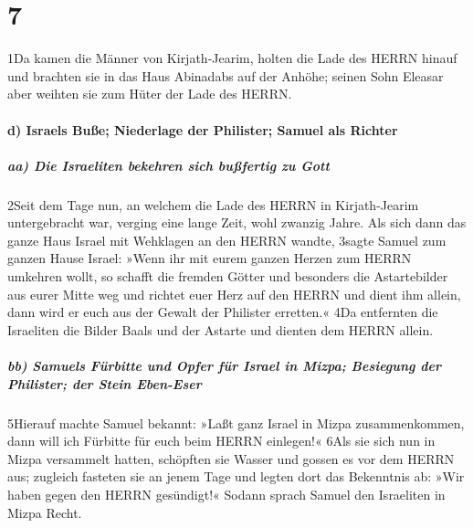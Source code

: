 \hypertarget{section-6}{%
\section{7}\label{section-6}}

1Da kamen die Männer von Kirjath-Jearim, holten die Lade des HERRN
hinauf und brachten sie in das Haus Abinadabs auf der Anhöhe; seinen
Sohn Eleasar aber weihten sie zum Hüter der Lade des HERRN.

\hypertarget{d-israels-buuxdfe-niederlage-der-philister-samuel-als-richter}{%
\paragraph{d) Israels Buße; Niederlage der Philister; Samuel als
Richter}\label{d-israels-buuxdfe-niederlage-der-philister-samuel-als-richter}}

\hypertarget{aa-die-israeliten-bekehren-sich-buuxdffertig-zu-gott}{%
\subparagraph{aa) Die Israeliten bekehren sich bußfertig zu
Gott}\label{aa-die-israeliten-bekehren-sich-buuxdffertig-zu-gott}}

2Seit dem Tage nun, an welchem die Lade des HERRN in Kirjath-Jearim
untergebracht war, verging eine lange Zeit, wohl zwanzig Jahre. Als sich
dann das ganze Haus Israel mit Wehklagen an den HERRN wandte, 3sagte
Samuel zum ganzen Hause Israel: »Wenn ihr mit eurem ganzen Herzen zum
HERRN umkehren wollt, so schafft die fremden Götter und besonders die
Astartebilder aus eurer Mitte weg und richtet euer Herz auf den HERRN
und dient ihm allein, dann wird er euch aus der Gewalt der Philister
erretten.« 4Da entfernten die Israeliten die Bilder Baals und der
Astarte und dienten dem HERRN allein.

\hypertarget{bb-samuels-fuxfcrbitte-und-opfer-fuxfcr-israel-in-mizpa-besiegung-der-philister-der-stein-eben-eser}{%
\subparagraph{bb) Samuels Fürbitte und Opfer für Israel in Mizpa;
Besiegung der Philister; der Stein
Eben-Eser}\label{bb-samuels-fuxfcrbitte-und-opfer-fuxfcr-israel-in-mizpa-besiegung-der-philister-der-stein-eben-eser}}

5Hierauf machte Samuel bekannt: »Laßt ganz Israel in Mizpa
zusammenkommen, dann will ich Fürbitte für euch beim HERRN einlegen!«
6Als sie sich nun in Mizpa versammelt hatten, schöpften sie Wasser und
gossen es vor dem HERRN aus; zugleich fasteten sie an jenem Tage und
legten dort das Bekenntnis ab: »Wir haben gegen den HERRN gesündigt!«
Sodann sprach Samuel den Israeliten in Mizpa Recht.

